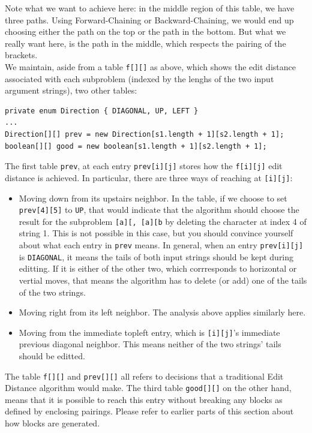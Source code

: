 \documentclass{article}
\begin{document}
Note what we want to achieve here: in the middle region of this table, we have three paths. Using Forward-Chaining or Backward-Chaining, we would end up choosing either the path on the top or the path in the bottom. But what we really want here, is the path in the middle, which respects the pairing of the brackets. \\

We maintain, aside from a table \texttt{f[][]} as above, which shows the edit distance associated with each subproblem (indexed by the lenghs of the two input argument strings), two other tables:
\begin{lstlisting}
private enum Direction { DIAGONAL, UP, LEFT }
...
Direction[][] prev = new Direction[s1.length + 1][s2.length + 1];
boolean[][] good = new boolean[s1.length + 1][s2.length + 1];
\end{lstlisting}
The first table \texttt{prev}, at each entry \texttt{prev[i][j]} stores how the \texttt{f[i][j]} edit distance is achieved. In particular, there are three ways of reaching at \texttt{[i][j]}:
\begin{itemize}
  \item Moving down from its upstairs neighbor. In the table, if we choose to set \texttt{prev[4][5]} to \texttt{UP}, that would indicate that the algorithm should choose the result for the subproblem \texttt{[a][, [a][b} by deleting the character at index 4 of string 1. This is not possible in this case, but you should convince yourself about what each entry in \texttt{prev} means. In general, when an entry \texttt{prev[i][j]} is \texttt{DIAGONAL}, it means the tails of both input strings should be kept during editting. If it is either of the other two, which corrresponds to horizontal or vertial moves, that means the algorithm has to delete (or add) one of the tails of the two strings.
  \item Moving right from its left neighbor. The analysis above applies similarly here. 
  \item Moving from the immediate topleft entry, which is \texttt{[i][j]}'s immediate previous diagonal neighbor. This means neither of the two strings' tails should be editted. 
\end{itemize}
The table \texttt{f[][]} and \texttt{prev[][]} all refers to decisions that a traditional Edit Distance algorithm would make. The third table \texttt{good[][]} on the other hand, means that it is possible to reach this entry without breaking any blocks as defined by enclosing pairings. Please refer to earlier parts of this section about how blocks are generated.\\
\end{document}
